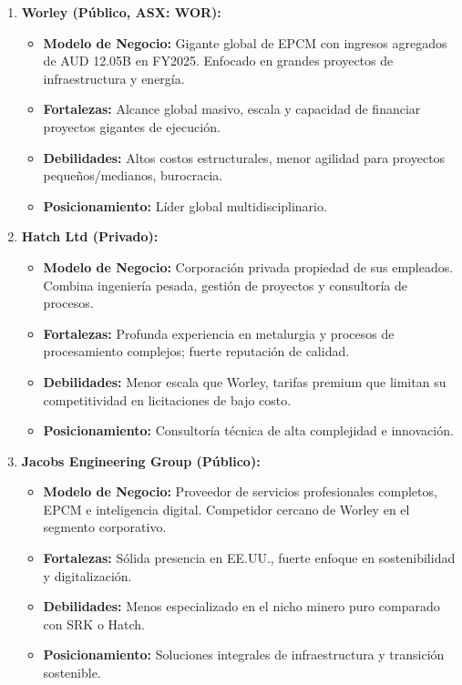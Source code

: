 \begin{enumerate}
    \item \textbf{Worley (Público, ASX: WOR):}
    \begin{itemize}
        \item \textbf{Modelo de Negocio:} Gigante global de EPCM con ingresos agregados de AUD 12.05B en FY2025. Enfocado en grandes proyectos de infraestructura y energía.
        \item \textbf{Fortalezas:} Alcance global masivo, escala y capacidad de financiar proyectos gigantes de ejecución.
        \item \textbf{Debilidades:} Altos costos estructurales, menor agilidad para proyectos pequeños/medianos, burocracia.
        \item \textbf{Posicionamiento:} Líder global multidisciplinario.
    \end{itemize}

    \item \textbf{Hatch Ltd (Privado):}
    \begin{itemize}
        \item \textbf{Modelo de Negocio:} Corporación privada propiedad de sus empleados. Combina ingeniería pesada, gestión de proyectos y consultoría de procesos.
        \item \textbf{Fortalezas:} Profunda experiencia en metalurgia y procesos de procesamiento complejos; fuerte reputación de calidad.
        \item \textbf{Debilidades:} Menor escala que Worley, tarifas premium que limitan su competitividad en licitaciones de bajo costo.
        \item \textbf{Posicionamiento:} Consultoría técnica de alta complejidad e innovación.
    \end{itemize}

    \item \textbf{Jacobs Engineering Group (Público):}
    \begin{itemize}
        \item \textbf{Modelo de Negocio:} Proveedor de servicios profesionales completos, EPCM e inteligencia digital. Competidor cercano de Worley en el segmento corporativo.
        \item \textbf{Fortalezas:} Sólida presencia en EE.UU., fuerte enfoque en sostenibilidad y digitalización.
        \item \textbf{Debilidades:} Menos especializado en el nicho minero puro comparado con SRK o Hatch.
        \item \textbf{Posicionamiento:} Soluciones integrales de infraestructura y transición sostenible.
    \end{itemize}


\end{enumerate}
